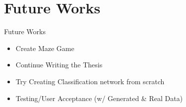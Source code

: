 \section{Future Works}
\begin{frame}{Future Works}
\begin{itemize}
    \item Create Maze Game
    \item Continue Writing the Thesis
    \item Try Creating Classification network from scratch
    \item Testing/User Acceptance (w/ Generated \& Real Data)
\end{itemize}
\end{frame}